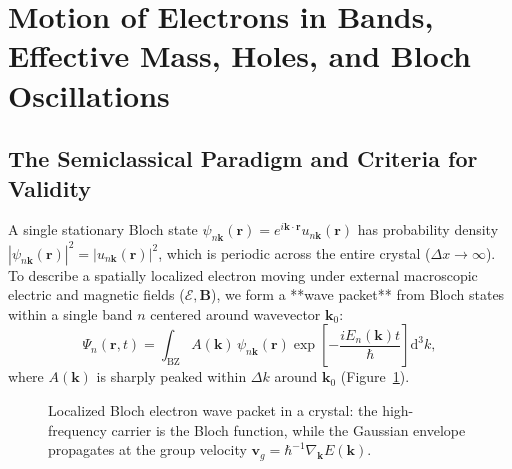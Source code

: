 \documentclass[11pt,a4paper]{article}
\newcommand{\abs}[1]{\left|#1\right|}
\newcommand{\vb}[1]{\mathbf{#1}}
\newcommand{\hb}{\hbar}
\newcommand{\dd}{\mathrm{d}}
\newcommand{\kk}{\mathbf{k}}
\newcommand{\rvec}{\mathbf{r}}
\newcommand{\BZ}{\text{BZ}}
\begin{document}
\section{Motion of Electrons in Bands, Effective Mass, Holes, and Bloch Oscillations}
\label{sec:electron_dynamics}

\subsection{The Semiclassical Paradigm and Criteria for Validity}
A single stationary Bloch state $\psi_{n\kk}(\rvec) = e^{i\kk\cdot\rvec}u_{n\kk}(\rvec)$ has probability density $\abs{\psi_{n\kk}(\rvec)}^2 = \abs{u_{n\kk}(\rvec)}^2$, which is periodic across the entire crystal ($\Delta x \to \infty$). To describe a spatially localized electron moving under external macroscopic electric and magnetic fields ($\bm{\mathcal{E}}, \vb{B}$), we form a **wave packet** from Bloch states within a single band $n$ centered around wavevector $\kk_0$:
\begin{equation}
    \Psi_n(\rvec, t) = \int_{\BZ} A(\kk)\,\psi_{n\kk}(\rvec)\exp\left[-\frac{iE_n(\kk)t}{\hb}\right]\dd^3 k,
\end{equation}
where $A(\kk)$ is sharply peaked within $\Delta k$ around $\kk_0$ (Figure~\ref{fig:wavepacket_master}).

\begin{figure}[htbp]
\centering
{}
\caption{Localized Bloch electron wave packet in a crystal: the high-frequency carrier is the Bloch function, while the Gaussian envelope propagates at the group velocity $\bm{v}_g = \hb^{-1}\nabla_{\kk}E(\kk)$.}
\label{fig:wavepacket_master}
\end{figure}
\end{document}
